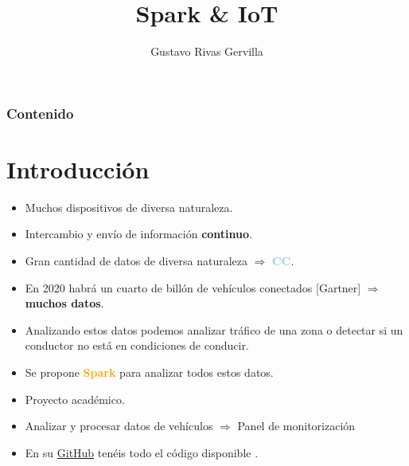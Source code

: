 \documentclass[dvipsnames]{beamer}
\date{} %
\author{Gustavo Rivas Gervilla}
\title{Spark \& IoT}
\begin{document}
	\begin{frame}[plain]
		\titlepage
	\end{frame}
		
	\begin{frame}
		\frametitle{Contenido}
		\tableofcontents
	\end{frame}
	
	\AtBeginSection[]{
		\begin{frame}
			\frametitle{Contenido}
			\tableofcontents[currentsection]
		\end{frame}
	}
	
	\section{Introducción}
	
        \begin{frame}
          \begin{itemize}
          \item Muchos dispositivos de diversa naturaleza.
          \item Intercambio y envío de información \textbf{continuo}.
          \item \textcolor{deepRed}{Gran cantidad} de datos de diversa naturaleza $\Rightarrow$ \textcolor{SkyBlue}{\textbf{CC}}. 
          \end{itemize}
        \end{frame}

        \begin{frame}
          \begin{itemize}
          \item En 2020 habrá un cuarto de billón de vehículos conectados [Gartner] $\Rightarrow$ \textbf{muchos datos}.
          \item Analizando estos datos podemos analizar tráfico de una zona o detectar si un conductor no está en condiciones de conducir.
          \item Se propone \textcolor{orange}{\textbf{Spark}} para analizar todos estos datos.
          \end{itemize}
        \end{frame}

        \begin{frame}
          \begin{itemize}
          \item Proyecto académico.
          \item Analizar y procesar datos de vehículos $\Rightarrow$ Panel de monitorización
          \item En su \href{https://github.com/baghelamit/iot-traffic-monitor}{\textcolor{deepBlue}{GitHub}} tenéis todo el código disponible \Winkey.
          \end{itemize}
        \end{frame}
\end{document}
